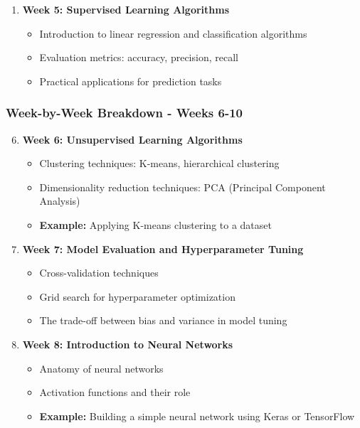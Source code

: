 \documentclass[aspectratio=169]{beamer}
\begin{document}
\begin{frame}
\begin{enumerate}
        \item \textbf{Week 5: Supervised Learning Algorithms}
            \begin{itemize}
                \item Introduction to linear regression and classification algorithms
                \item Evaluation metrics: accuracy, precision, recall
                \item Practical applications for prediction tasks
            \end{itemize}
    \end{enumerate}
\end{frame}

\begin{frame}
    \frametitle{Week-by-Week Breakdown - Weeks 6-10}
    \begin{enumerate}
        \setcounter{enumi}{5}
        \item \textbf{Week 6: Unsupervised Learning Algorithms}
            \begin{itemize}
                \item Clustering techniques: K-means, hierarchical clustering
                \item Dimensionality reduction techniques: PCA (Principal Component Analysis)
                \item \textbf{Example:} Applying K-means clustering to a dataset
            \end{itemize}

        \item \textbf{Week 7: Model Evaluation and Hyperparameter Tuning}
            \begin{itemize}
                \item Cross-validation techniques
                \item Grid search for hyperparameter optimization
                \item The trade-off between bias and variance in model tuning
            \end{itemize}

        \item \textbf{Week 8: Introduction to Neural Networks}
            \begin{itemize}
                \item Anatomy of neural networks
                \item Activation functions and their role
                \item \textbf{Example:} Building a simple neural network using Keras or TensorFlow
            \end{itemize}


\end{enumerate}
\end{frame}
\end{document}
